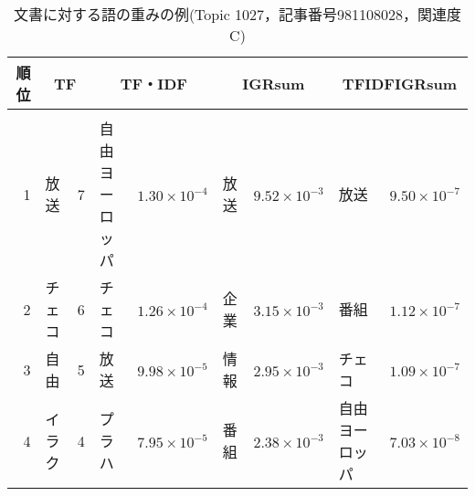 \begin{table}[htbp]
\caption{文書に対する語の重みの例(Topic 1027，記事番号981108028，関連度C)}
\label{Table:weight1027C}
\footnotesize
\begin{center}
{\footnotesize
\begin{tabular}{|r|ll|ll|ll|ll|}
  \hline
  \hspace{-1mm}順位\hspace{-1mm}	  & \multicolumn{2}{c|}{TF}& \multicolumn{2}{c|}{TF・IDF} & \multicolumn{2}{c|}{IGRsum} & \multicolumn{2}{c|}{TFIDFIGRsum}\\ \hline
& & & & & & & & \\[-8pt]
  1       & 放送           & \hspace{-2mm}7\hspace{-1.0mm} & 自由ヨーロッパ & \hspace{-2mm}$1.30\times 10^{-4}$\hspace{-1.5mm} & 放送    & \hspace{-2mm}$9.52\times 10^{-3}$\hspace{-1.5mm} & 放送            & \hspace{-2mm}$9.50\times 10^{-7}$\hspace{-1.5mm} \\
  2	  & チェコ         & \hspace{-2mm}6\hspace{-1.0mm} & チェコ         & \hspace{-2mm}$1.26\times 10^{-4}$\hspace{-1.5mm} & 企業    & \hspace{-2mm}$3.15\times 10^{-3}$\hspace{-1.5mm} & 番組            & \hspace{-2mm}$1.12\times 10^{-7}$\hspace{-1.5mm} \\
  3	  & 自由           & \hspace{-2mm}5\hspace{-1.0mm} & 放送           & \hspace{-2mm}$9.98\times 10^{-5}$\hspace{-1.5mm} & 情報    & \hspace{-2mm}$2.95\times 10^{-3}$\hspace{-1.5mm} & チェコ          & \hspace{-2mm}$1.09\times 10^{-7}$\hspace{-1.5mm} \\
  4	  & イラク         & \hspace{-2mm}4\hspace{-1.0mm} & プラハ         & \hspace{-2mm}$7.95\times 10^{-5}$\hspace{-1.5mm} & 番組    & \hspace{-2mm}$2.38\times 10^{-3}$\hspace{-1.5mm} & 自由ヨーロッパ  & \hspace{-2mm}$7.03\times 10^{-8}$\hspace{-1.5mm} \\

\end{tabular}}
\end{center}
\end{table}
